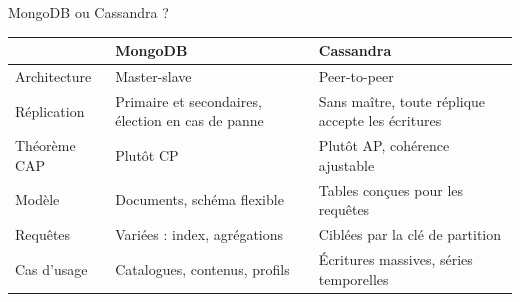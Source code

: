 \begin{frame}{MongoDB ou Cassandra ?}
    \small
    \begin{tabular}{p{}p{}p{}}
        \toprule
                     & \textbf{MongoDB}                                  & \textbf{Cassandra}                                \\
        \midrule
        Architecture & Master-slave                                      & Peer-to-peer                                      \\
        Réplication  & Primaire et secondaires, élection en cas de panne & Sans maître, toute réplique accepte les écritures \\
        Théorème CAP & Plutôt CP                                         & Plutôt AP, cohérence ajustable                    \\
        Modèle       & Documents, schéma flexible                        & Tables conçues pour les requêtes                  \\
        Requêtes     & Variées : index, agrégations                      & Ciblées par la clé de partition                   \\
        Cas d'usage  & Catalogues, contenus, profils                     & Écritures massives, séries temporelles            \\
        \bottomrule
    \end{tabular}

\end{frame}


